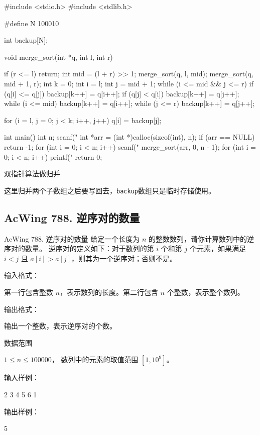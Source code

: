 \begin{mycpptwocol}
    #include <stdio.h>
    #include <stdlib.h>

    #define N 100010

    int backup[N];

    void merge_sort(int *q, int l, int r)
    {
        if (r <= l) {
            return;
        }
        int mid = (l + r) >> 1;
        merge_sort(q, l, mid);
        merge_sort(q, mid + 1, r);
        int k = 0;
        int i = l;
        int j = mid + 1;
        while (i <= mid && j <= r) {
            if (q[i] <= q[j]) {
                backup[k++] = q[i++];
            }
            if (q[j] < q[i]) {
                backup[k++] = q[j++];
            }
        }
        while (i <= mid) {
            backup[k++] = q[i++];
        }
        while (j <= r) {
            backup[k++] = q[j++];
        }
        
        for (i = l, j = 0; j < k; i++, j++) {
            q[i] = backup[j];
        }
    }

    int main()
    {
        int n;
        scanf("%
        int *arr = (int *)calloc(sizeof(int), n);
        if (arr == NULL) {
            return -1;
        }
        for (int i = 0; i < n; i++) {
            scanf("%
        }
        merge_sort(arr, 0, n - 1);
        for (int i = 0; i < n; i++) {
            printf("%
        }
        return 0;
    }
\end{mycpptwocol}

双指针算法做归并

\begin{keypoint}
    这里归并两个子数组之后要写回去，\lstinline{backup}数组只是临时存储使用。
\end{keypoint}

\subsection{AcWing 788. 逆序对的数量}
\begin{titledbox}{AcWing 788. 逆序对的数量}
    给定一个长度为 $n$ 的整数数列，请你计算数列中的逆序对的数量。
    逆序对的定义如下：对于数列的第 $i$ 个和第 $j$ 个元素，如果满足 $i < j$ 且 $a[i] > a[j]$，则其为一个逆序对；否则不是。
    
    输入格式：

    第一行包含整数 $n$，表示数列的长度。第二行包含 $n$ 个整数，表示整个数列。
    
    输出格式：
    
    输出一个整数，表示逆序对的个数。

    数据范围

    $1 \le n \le 100000$，
    数列中的元素的取值范围 $[1,10^9]$。
    
    输入样例：

    2 3 4 5 6 1
    
    输出样例：
    
    5
\end{titledbox}

